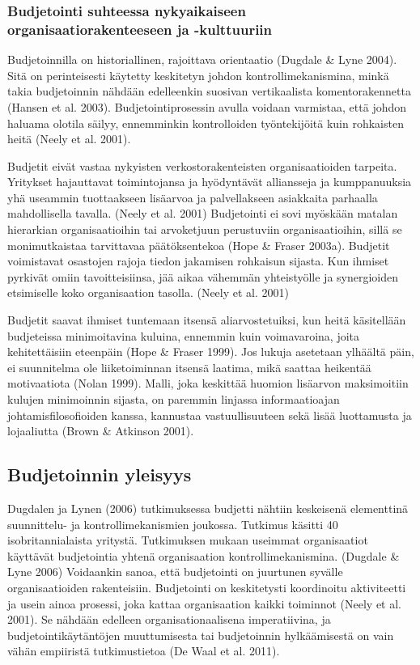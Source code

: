 \documentclass[12pt,a4paper,oneside,pdftex]{report}
\begin{document}
\subsubsection{Budjetointi suhteessa nykyaikaiseen organisaatiorakenteeseen ja -kulttuuriin}

Budjetoinnilla on historiallinen, rajoittava orientaatio (Dugdale & Lyne 2004). Sitä on perinteisesti käytetty keskitetyn johdon kontrollimekanismina, minkä takia budjetoinnin nähdään edelleenkin suosivan vertikaalista komentorakennetta (Hansen et al. 2003). Budjetointiprosessin avulla voidaan varmistaa, että johdon haluama olotila säilyy, ennemminkin kontrolloiden työntekijöitä kuin rohkaisten heitä (Neely et al. 2001).

Budjetit eivät vastaa nykyisten verkostorakenteisten organisaatioiden tarpeita. Yritykset hajauttavat toimintojansa ja hyödyntävät alliansseja ja kumppanuuksia yhä useammin tuottaakseen lisäarvoa ja palvellakseen asiakkaita parhaalla mahdollisella tavalla. (Neely et al. 2001) Budjetointi ei sovi myöskään matalan hierarkian organisaatioihin tai arvoketjuun perustuviin organisaatioihin, sillä se monimutkaistaa tarvittavaa päätöksentekoa (Hope & Fraser 2003a). Budjetit voimistavat osastojen rajoja tiedon jakamisen rohkaisun sijasta. Kun ihmiset pyrkivät omiin tavoitteisiinsa, jää aikaa vähemmän yhteistyölle ja synergioiden etsimiselle koko organisaation tasolla. (Neely et al. 2001)

Budjetit saavat ihmiset tuntemaan itsensä aliarvostetuiksi, kun heitä käsitellään budjeteissa minimoitavina kuluina, ennemmin kuin voimavaroina, joita kehitettäisiin eteenpäin (Hope & Fraser 1999). Jos lukuja asetetaan ylhäältä päin, ei suunnitelma ole liiketoiminnan itsensä laatima, mikä saattaa heikentää motivaatiota (Nolan 1999). Malli, joka keskittää huomion lisäarvon maksimoitiin kulujen minimoinnin sijasta, on paremmin linjassa informaatioajan johtamisfilosofioiden kanssa, kannustaa vastuullisuuteen sekä lisää luottamusta ja lojaaliutta (Brown & Atkinson 2001).

\subsection{Budjetoinnin yleisyys}

Dugdalen ja Lynen (2006) tutkimuksessa budjetti nähtiin keskeisenä elementtinä suunnittelu- ja kontrollimekanismien joukossa. Tutkimus käsitti 40 isobritannialaista yritystä. Tutkimuksen mukaan useimmat organisaatiot käyttävät budjetointia yhtenä organisaation kontrollimekanismina. (Dugdale & Lyne 2006) Voidaankin sanoa, että budjetointi on juurtunen syvälle organisaatioiden rakenteisiin. Budjetointi on keskitetysti koordinoitu aktiviteetti ja usein ainoa prosessi, joka kattaa organisaation kaikki toiminnot (Neely et al. 2001). Se nähdään edelleen organisationaalisena imperatiivina, ja budjetointikäytäntöjen muuttumisesta tai budjetoinnin hylkäämisestä on vain vähän empiiristä tutkimustietoa (De Waal et al. 2011).
\end{document}
